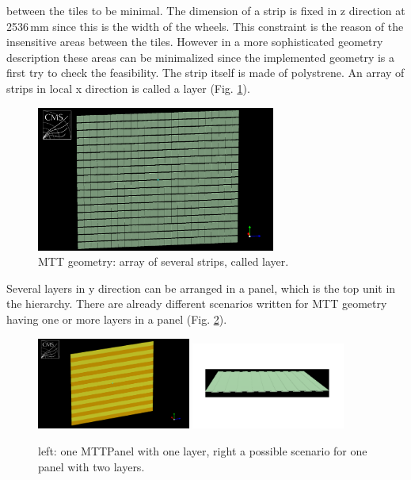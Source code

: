 			between the tiles to be minimal.
			The dimension of a strip is fixed in z direction at 2536\,mm since this is the width of the wheels.
			This constraint is the reason of the insensitive areas between the tiles.
			However in a more sophisticated geometry description these areas can be minimalized since the implemented geometry is a first try to check the feasibility. 
			The strip itself is made of polystrene.
			An array of strips in local x direction is called a layer (Fig. \ref{fig:layer}).
			\begin{figure}[htbp]
				\centering
				\includegraphics[width=0.70\textwidth]{Figures/erdogan/layer.png}
				\caption{MTT geometry: array of several strips, called layer.}
				\label{fig:layer}
			\end{figure}
			Several layers in y direction can be arranged in a panel, which is the top unit in the hierarchy.
			There are already different scenarios written for MTT geometry having one or more layers in a panel (Fig. \ref{fig:panel}).
			\begin{figure}[htbp]
				\centering
				\includegraphics[width=0.45\textwidth]{Figures/erdogan/panel1.png}
				\includegraphics[width=0.45\textwidth]{Figures/erdogan/panel2.png}
				\caption{left: one MTTPanel with one layer, right a possible scenario for one panel with two layers.}
				\label{fig:panel}
			\end{figure}
